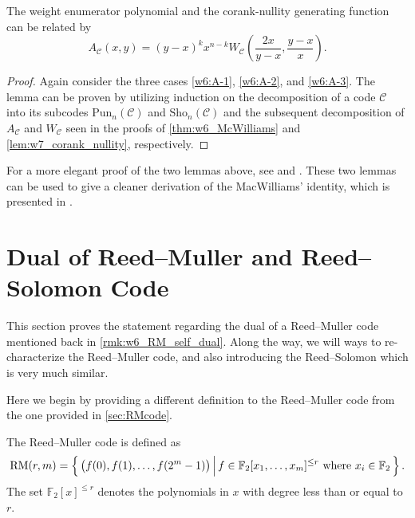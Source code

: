 \begin{lemma}[(Greene's)] \label{lem:w7_Greene}
    The weight enumerator polynomial and the corank-nullity generating function can be related by
    \begin{equation}
        A_\mathcal{C}(x,y) = (y-x)^kx^{n-k} W_\mathcal{C}\left(\frac{2x}{y-x},\frac{y-x}{x}\right).
    \end{equation}
\end{lemma}
\begin{proof}
    Again consider the three cases \ref{w6:A-1}, \ref{w6:A-2}, and \ref{w6:A-3}. The lemma can be proven by utilizing induction on the decomposition of a code $\mathcal{C}$ into its subcodes $\mathrm{Pun}_n(\mathcal{C})$ and $\mathrm{Sho}_n(\mathcal{C})$ and the subsequent decomposition of $A_\mathcal{C}$ and $W_\mathcal{C}$ seen in the proofs of \autoref{thm:w6_McWilliams} and \autoref{lem:w7_corank_nullity}, respectively.
\end{proof}

For a more elegant proof of the two lemmas above, see  and . These two lemmas can be used to give a cleaner derivation of the MacWilliams' identity, which is presented in .








\section{Dual of Reed--Muller and Reed--Solomon Code} \label{sec:w7_RM_RS}

This section proves the statement regarding the dual of a Reed--Muller code mentioned back in \autoref{rmk:w6_RM_self_dual}. Along the way, we will ways to re-characterize the Reed--Muller code, and also introducing the Reed--Solomon which is very much similar.

Here we begin by providing a different definition to the Reed--Muller code from the one provided in \autoref{sec:RMcode}.
\begin{definition}
    The Reed--Muller code is defined as
    \begin{equation}
        \mathrm{RM}(r,m) = \left\{\,{\left(f(0),f(1),\ldots,f(2^m-1)\right)}\,\middle\vert\,{f\in\mathbb{F}_2[x_1,\ldots,x_m]^{\le r}\text{ where }x_i\in\mathbb{F}_2}\,\right\}.
    \end{equation}
    The set $\mathbb{F}_2[x]^{\le r}$ denotes the polynomials in $x$ with degree less than or equal to $r$.
\end{definition}

